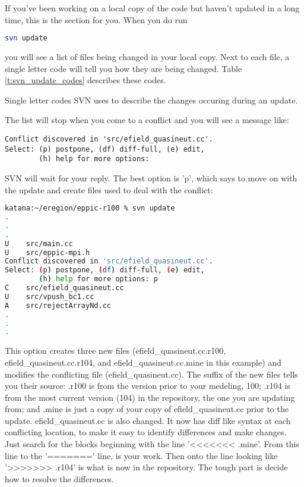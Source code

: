 If you've been working on a local copy of the code but haven't updated
in a long time, this is the section for you. When you do run 
\begin{lstlisting}[language=BASH]
  svn update
\end{lstlisting}
\noindent you will see a list of files being changed in your local
copy. Next to each file, a single letter code will tell you how they
are being changed. Table \ref{t:svn_update_codes} describes these
codes.
\begin{table}\label{t:svn_update_codes}

\caption{Single letter codes SVN uses to describe the changes occuring
  during an update.}
\end{table}
\noindent The list will stop when you come to a conflict and you will
see a message like:
\begin{verbatim}
Conflict discovered in 'src/efield_quasineut.cc'.
Select: (p) postpone, (df) diff-full, (e) edit,
        (h) help for more options: 
\end{verbatim}
\noindent SVN will wait for your reply. The best option is 'p', which
says to move on with the update and create files used to deal with the
conflict:
\begin{lstlisting}[language=BASH]
  katana:~/eregion/eppic-r100 % svn update
.
.
.
U    src/main.cc
U    src/eppic-mpi.h
Conflict discovered in 'src/efield_quasineut.cc'.
Select: (p) postpone, (df) diff-full, (e) edit,
        (h) help for more options: p
C    src/efield_quasineut.cc
U    src/vpush_bc1.cc
A    src/rejectArrayNd.cc
.
.
.
\end{lstlisting}
\noindent This option creates three new files
(efield\_quasineut.cc.r100, efield\_quasineut.cc.r104, and
efield\_quasineut.cc.mine in this example) and modifies the
conflicting file (efield\_quasineut.cc). The suffix of the new files
tells you their source: .r100 is from the version prior to your
medeling, 100; .r104 is from the most current version (104) in the
repository, the one you are updating from; and .mine is just a copy of
your copy of efield\_quasineut.cc prior to the
update. efield\_quasineut.cc is also changed. It now has diff like
syntax at each conflicting location, to make it easy to identify
differences and make changes. Just search for the blocks beginning
with the line '<<<<<<< .mine'. From this line to the '======='
line, is your work. Then onto the line looking like '>>>>>>> .r104' is
what is now in the repository. The tough part is decide how to resolve
the differences. 
 
